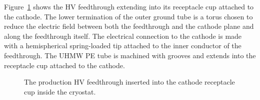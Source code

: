 
Figure~\ref{fig:hv-FT-cryostat} shows the HV feedthrough extending into its receptacle cup attached to the \lartpc cathode.  The lower termination of the outer ground tube is a torus chosen to reduce the electric field between both the feedthrough and the cathode plane and along the feedthrough itself.  The electrical connection to the cathode is made with a hemispherical spring-loaded tip attached to the inner conductor of the feedthrough.  The UHMW PE tube is machined with grooves and extends into the receptacle cup attached to the cathode.

\begin{figure}
\caption{The production HV feedthrough inserted into the cathode receptacle cup inside the cryostat.}
\label{fig:hv-FT-cryostat}
\end{figure}
